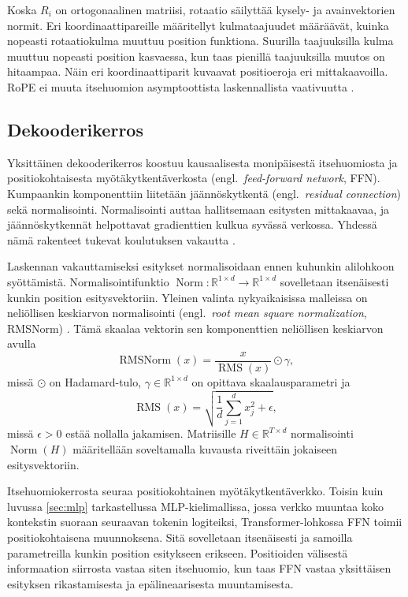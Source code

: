 Koska \(R_i\) on ortogonaalinen matriisi, rotaatio säilyttää kysely- ja avainvektorien normit. Eri koordinaattipareille määritellyt kulmataajuudet määräävät, kuinka nopeasti rotaatiokulma muuttuu position funktiona. Suurilla taajuuksilla kulma muuttuu nopeasti position kasvaessa, kun taas pienillä taajuuksilla muutos on hitaampaa. Näin eri koordinaattiparit kuvaavat positioeroja eri mittakaavoilla. RoPE ei muuta itsehuomion asymptoottista laskennallista vaativuutta \cite{su2024roformer}.

\subsection{Dekooderikerros}

Yksittäinen dekooderikerros koostuu kausaalisesta monipäisestä
itsehuomiosta ja positiokohtaisesta myötäkytkentäverkosta (engl.\ \emph{feed-forward network}, FFN).
Kumpaankin komponenttiin liitetään jäännöskytkentä
(engl.\ \emph{residual connection}) sekä normalisointi.
Normalisointi auttaa hallitsemaan esitysten mittakaavaa,
ja jäännöskytkennät helpottavat gradienttien kulkua syvässä
verkossa. Yhdessä nämä rakenteet tukevat koulutuksen
vakautta \cite{he2016deep, ba2016layer, vaswani2017attention}.

Laskennan vakauttamiseksi esitykset normalisoidaan ennen kuhunkin
alilohkoon syöttämistä. Normalisointifunktio \(\operatorname{Norm} \colon
\mathbb{R}^{1 \times d} \to \mathbb{R}^{1 \times d}\) sovelletaan itsenäisesti kunkin position
esitysvektoriin. Yleinen valinta nykyaikaisissa malleissa on neliöllisen
keskiarvon normalisointi (engl.\ \emph{root mean square normalization},
RMSNorm) \cite{zhang2019root}. Tämä skaalaa vektorin sen komponenttien neliöllisen keskiarvon avulla
$$
\operatorname{RMSNorm}(x) = \frac{x}{\operatorname{RMS}(x)} \odot \gamma,
$$
missä \(\odot\) on Hadamard-tulo, \(\gamma \in \mathbb{R}^{1 \times d}\)
on opittava skaalausparametri ja
$$
\operatorname{RMS}(x) = \sqrt{\frac{1}{d} \sum_{j=1}^{d} x_j^2 + \epsilon},
$$
missä \(\epsilon > 0\) estää nollalla jakamisen. Matriisille
\(H \in \mathbb{R}^{T \times d}\) normalisointi \(\operatorname{Norm}(H)\)
määritellään soveltamalla kuvausta riveittäin jokaiseen esitysvektoriin.

Itsehuomiokerrosta seuraa positiokohtainen myötäkytkentäverkko. Toisin kuin luvussa \ref{sec:mlp}
tarkastellussa MLP-kielimallissa, jossa verkko muuntaa koko kontekstin suoraan
seuraavan tokenin logiteiksi, Transformer-lohkossa FFN toimii positiokohtaisena
muunnoksena. Sitä sovelletaan itsenäisesti ja samoilla parametreilla kunkin
position esitykseen erikseen. Positioiden välisestä informaation siirrosta
vastaa siten itsehuomio, kun taas FFN vastaa yksittäisen esityksen rikastamisesta
ja epälineaarisesta muuntamisesta.

